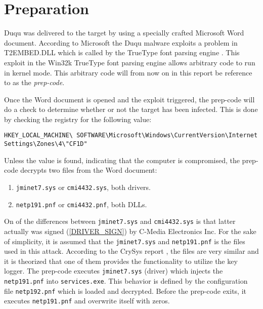 \documentclass[11pt,english,a4paper]{report}
\begin{document}
\section{Preparation}
Duqu was delivered to the target by using a specially crafted Microsoft Word document. According to Microsoft the Duqu malware exploits a problem in T2EMBED.DLL which is called by the TrueType font parsing engine \cite{RYAN_ZDNET}. This exploit in the Win32k TrueType font parsing engine allows arbitrary code to run in kernel mode. This arbitrary code will from now on in this report be reference to as the \textit{prep-code}. 

Once the Word document is opened and the exploit triggered, the prep-code will do a check to determine whether or not the target has been infected. This is done by checking the registry for the following value:
\begin{lstlisting}
HKEY_LOCAL_MACHINE\ SOFTWARE\Microsoft\Windows\CurrentVersion\Internet Settings\Zones\4\"CF1D" 
\end{lstlisting}
Unless the value is found, indicating that the computer is compromised, the prep-code decrypts two files from the Word document:
 \begin{enumerate}
   \item  \texttt{jminet7.sys} or \texttt{cmi4432.sys}, both drivers.
   \item  \texttt{netp191.pnf} or \texttt{cmi4432.pnf}, both DLLs.
  \end{enumerate}
{\raggedright
On of the differences between \texttt{jminet7.sys} and \texttt{cmi4432.sys} is that latter actually was signed (\ref{DRIVER_SIGN}) by C-Media Electronics Inc. For the sake of simplicity, it is assumed that the \texttt{jminet7.sys} and \texttt{netp191.pnf} is the files used in this attack. According to the CrySys report \cite{DUQU_BUD}, the files are very similar and it is theorized that one of them provides the functionality to utilize the key logger. The prep-code executes \texttt{jminet7.sys} (driver) which injects the \texttt{netp191.pnf} into \texttt{services.exe}. This behavior is defined by the configuration file \texttt{netp192.pnf} which is loaded and decrypted. Before the prep-code exits, it executes \texttt{netp191.pnf} and overwrite itself with zeros. 
\par}
\end{document}
